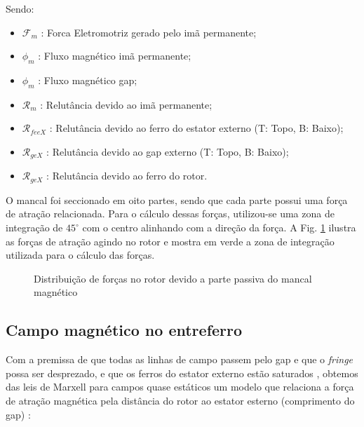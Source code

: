 Sendo:
\begin{itemize}
	\item $\mathcal{F}_m$ : Forca Eletromotriz gerado pelo imã permanente;
	\item $\phi_m$ : Fluxo magnético imã permanente;
	\item $\phi_m$ : Fluxo magnético gap;
	\item $\mathcal{R}_m$ : Relutância devido ao imã permanente;
	\item $\mathcal{R}_{feeX}$ : Relutância devido ao ferro do estator externo (T: Topo, B: Baixo);
	\item $\mathcal{R}_{geX}$ : Relutância devido ao gap externo (T: Topo, B: Baixo);
	\item $\mathcal{R}_{geX}$ : Relutância devido ao ferro do rotor.
\end{itemize}

O mancal foi seccionado em oito partes, sendo que cada parte possui uma força de atração relacionada. Para o cálculo dessas forças, utilizou-se uma zona de integração de $45^{\circ}$ com o centro alinhando com a direção da força. A Fig. \ref{Fig:Modelagem:circuito:passivo:forca} ilustra as forças de atração agindo no rotor e mostra em verde a zona de integração utilizada para o cálculo das forças.

\begin{figure}[!ht]
	\centering
	\def\svgwidth{0.8\columnwidth}
	
	\caption{Distribuição de forças no rotor devido a parte passiva do mancal magnético}
	\label{Fig:Modelagem:circuito:passivo:forca}
\end{figure}

\subsection{Campo magnético no entreferro}

Com a premissa de que todas as linhas de campo passem pelo gap e que o \textit{fringe} possa ser desprezado, e que os ferros do estator externo estão saturados , obtemos das leis de Marxell para campos quase estáticos um modelo que relaciona a força de atração magnética pela distância do rotor ao estator esterno (comprimento do gap)  :




